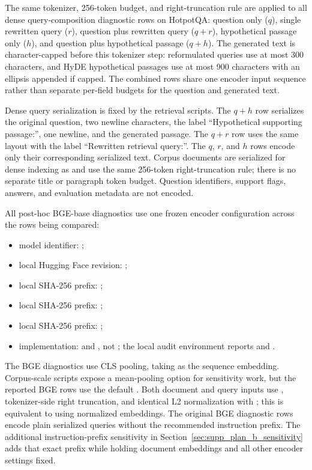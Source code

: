 \documentclass[pdflatex,sn-basic,Numbered]{sn-jnl}
\begin{document}
The same tokenizer, 256-token budget, and right-truncation rule are applied to all dense query-composition diagnostic rows on HotpotQA: question only ($q$), single rewritten query ($r$), question plus rewritten query ($q+r$), hypothetical passage only ($h$), and question plus hypothetical passage ($q+h$). The generated text is character-capped before this tokenizer step: reformulated queries use at most 300 characters, and HyDE hypothetical passages use at most 900 characters with an ellipsis appended if capped. The combined rows share one encoder input sequence rather than separate per-field budgets for the question and generated text.

Dense query serialization is fixed by the retrieval scripts. The $q+h$ row serializes the original question, two newline characters, the label ``Hypothetical supporting passage:'', one newline, and the generated passage. The $q+r$ row uses the same layout with the label ``Rewritten retrieval query:''. The $q$, $r$, and $h$ rows encode only their corresponding serialized text. Corpus documents are serialized for dense indexing as  and use the same 256-token right-truncation rule; there is no separate title or paragraph token budget. Question identifiers, support flags, answers, and evaluation metadata are not encoded.

All post-hoc BGE-base diagnostics use one frozen encoder configuration across the rows being compared:
\begin{itemize}
\item model identifier: ;
\item local Hugging Face  revision: ;
\item local  SHA-256 prefix: ;
\item local  SHA-256 prefix: ;
\item local  SHA-256 prefix: ;
\item implementation:  and , not ; the local audit environment reports  and .
\end{itemize}

The BGE diagnostics use CLS pooling, taking  as the sequence embedding. Corpus-scale scripts expose a mean-pooling option for sensitivity work, but the reported BGE rows use the default . Both document and query inputs use , tokenizer-side right truncation, and identical L2 normalization with ; this is equivalent to using normalized embeddings. The original BGE diagnostic rows encode plain serialized queries without the recommended instruction prefix. The additional instruction-prefix sensitivity in Section~\ref{sec:supp_plan_b_sensitivity} adds that exact prefix while holding document embeddings and all other encoder settings fixed.
\end{document}
